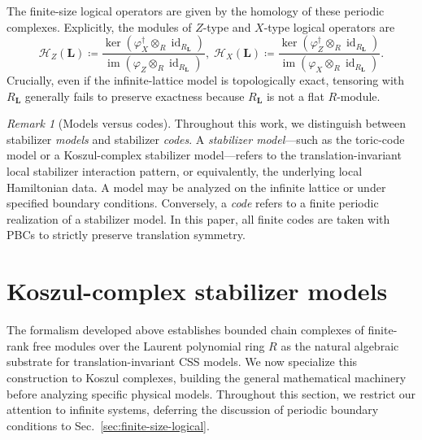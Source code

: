 \documentclass[aps,prx,english,superscriptaddress,twocolumn,tightenlines,showpacs,longbibliography,floatfix,amsfonts]{revtex4-2}
\theoremstyle{remark}
\newtheorem{remark}{Remark}
\theoremstyle{definition}
\begin{document}
The finite-size logical operators are given by the homology of these periodic complexes. Explicitly, the modules of $Z$-type and $X$-type logical operators are
\begin{equation}
	\!\!\mathcal{H}_Z(\mathbf{L}) \coloneqq \frac{\ker(\varphi_X^\dagger \otimes_R \operatorname{id}_{R_{\mathbf{L}}})}{\operatorname{im}(\varphi_Z \otimes_R \operatorname{id}_{R_{\mathbf{L}}})},
	\;
	\mathcal{H}_X(\mathbf{L}) \coloneqq \frac{\ker(\varphi_Z^\dagger \otimes_R \operatorname{id}_{R_{\mathbf{L}}})}{\operatorname{im}(\varphi_X \otimes_R \operatorname{id}_{R_{\mathbf{L}}})}.
	\label{eq:periodic-logical-modules}
\end{equation}
Crucially, even if the infinite-lattice model is topologically exact, tensoring with $R_{\mathbf L}$ generally fails to preserve exactness because $R_{\mathbf L}$ is not a flat $R$-module.

\begin{remark}[Models versus codes]
	Throughout this work, we distinguish between stabilizer \emph{models} and stabilizer \emph{codes}. A \emph{stabilizer model}---such as the toric-code model or a Koszul-complex stabilizer model---refers to the translation-invariant local stabilizer interaction pattern, or equivalently, the underlying local Hamiltonian data. A model may be analyzed on the infinite lattice or under specified boundary conditions. Conversely, a \emph{code} refers to a finite periodic realization of a stabilizer model. In this paper, all finite codes are taken with PBCs to strictly preserve translation symmetry. %
\end{remark}



\section{Koszul-complex stabilizer models}
\label{sec:koszul-complex-codes}

The formalism developed above establishes bounded chain complexes of
finite-rank free modules over the Laurent polynomial ring $R$ as the natural
algebraic substrate for translation-invariant CSS models. We now specialize
this construction to Koszul complexes, building the general mathematical
machinery before analyzing specific physical models.
Throughout this section, we restrict our attention to infinite systems, deferring the discussion of periodic boundary conditions to Sec.~\ref{sec:finite-size-logical}.
\end{document}

